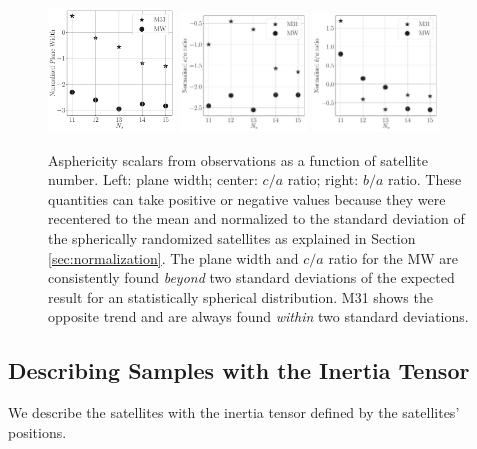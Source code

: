 \documentclass[a4paper,fleqn,usenatbib]{mnras}
\begin{document}
\begin{figure}
\centering
\includegraphics[width=0.30\textwidth]{normalized_width_n_dependence.pdf}
\includegraphics[width=0.30\textwidth]{normalized_ca_ratio_n_dependence.pdf}
\includegraphics[width=0.30\textwidth]{normalized_ba_ratio_n_dependence.pdf}
\caption{Asphericity scalars from observations as a function
  of satellite number. 
  Left: plane width; center: $c/a$ ratio;
  right: $b/a$ ratio. 
  These quantities can take positive or negative values because they
  were recentered to the mean and normalized to the standard deviation 
  of the spherically randomized satellites as explained in Section
  \ref{sec:normalization}. 
  The plane width and $c/a$ ratio for the MW are
  consistently found \emph{beyond} two standard
  deviations of the expected result for an statistically spherical
  distribution. 
  M31 shows the opposite trend and are always found
  \emph{within} two standard deviations. \label{fig:normalized_n}} 
\end{figure}



\subsection{Describing Samples with the Inertia Tensor}

We describe the satellites with the inertia
tensor defined by the satellites' positions.  
\end{document}
